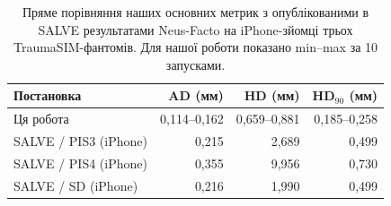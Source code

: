 \begin{table}[!t]
\centering
\scriptsize
\setlength{\tabcolsep}{3pt}
\begin{tabular}{lrrr}
\toprule
Постановка & AD (мм) & HD (мм) & HD$_{90}$ (мм) \\
\midrule
\rowcolor{green!8} Ця робота & 0,114--0,162 & 0,659--0,881 & 0,185--0,258 \\
SALVE / PIS3 (iPhone) & 0,215        & 2,689        & 0,499        \\
\rowcolor{blue!6} SALVE / PIS4 (iPhone) & 0,355        & 9,956        & 0,730        \\
SALVE / SD (iPhone)   & 0,216        & 1,990        & 0,499        \\
\bottomrule
\end{tabular}
\caption{Пряме порівняння наших основних метрик з опублікованими в SALVE результатами Neus-Facto на iPhone-зйомці трьох TraumaSIM-фантомів. Для нашої роботи показано min--max за 10 запусками.}
\label{tbl-salve-comparison}
\end{table}
